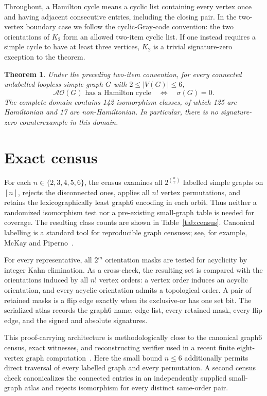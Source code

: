 \documentclass[11pt]{article}
\newtheorem{theorem}{Theorem}
\newcommand{\AO}{\mathcal{AO}}
\begin{document}
Throughout, a Hamilton cycle means a cyclic list containing every vertex once
and having adjacent consecutive entries, including the closing pair.  In the
two-vertex boundary case we follow the cyclic-Gray-code convention: the two
orientations of $K_2$ form an allowed two-item cyclic list.  If one instead
requires a simple cycle to have at least three vertices, $K_2$ is a trivial
signature-zero exception to the theorem.

\begin{theorem}\label{thm:atlas}
Under the preceding two-item convention, for every connected unlabelled
loopless simple graph $G$ with $2\leq |V(G)|\leq 6$,
\[
       \AO(G)\text{ has a Hamilton cycle}
       \quad\Longleftrightarrow\quad \sigma(G)=0.
\]
The complete domain contains 142 isomorphism classes, of which 125 are
Hamiltonian and 17 are non-Hamiltonian.  In particular, there is no
signature-zero counterexample in this domain.
\end{theorem}

\section{Exact census}

For each $n\in\{2,3,4,5,6\}$, the census examines all
$2^{\binom n2}$ labelled simple graphs on $[n]$, rejects the disconnected
ones, applies all $n!$ vertex permutations, and retains the lexicographically
least graph6 encoding in each orbit.  Thus neither a randomized isomorphism
test nor a pre-existing small-graph table is needed for coverage.  The
resulting class counts are shown in Table~\ref{tab:census}.  Canonical
labelling is a standard tool for reproducible graph censuses; see, for
example, McKay and Piperno~\cite{McKayPiperno2014}.

For every representative, all $2^m$ orientation masks are tested for
acyclicity by integer Kahn elimination.  As a cross-check, the resulting set
is compared with the orientations induced by all $n!$ vertex orders: a vertex
order induces an acyclic orientation, and every acyclic orientation admits a
topological order.  A pair of retained masks is a flip edge exactly when its
exclusive-or has one set bit.  The serialized atlas records the graph6 name,
edge list, every retained mask, every flip edge, and the signed and absolute
signatures.

This proof-carrying architecture is methodologically close to the canonical
graph6 census, exact witnesses, and reconstructing verifier used in a recent
finite eight-vertex graph computation~\cite{Zeng2026Whiskered}.  Here the
small bound $n\leq6$ additionally permits direct traversal of every labelled
graph and every permutation.  A second census check canonicalizes the
connected entries in an independently supplied small-graph atlas and rejects
isomorphism for every distinct same-order pair.
\end{document}
